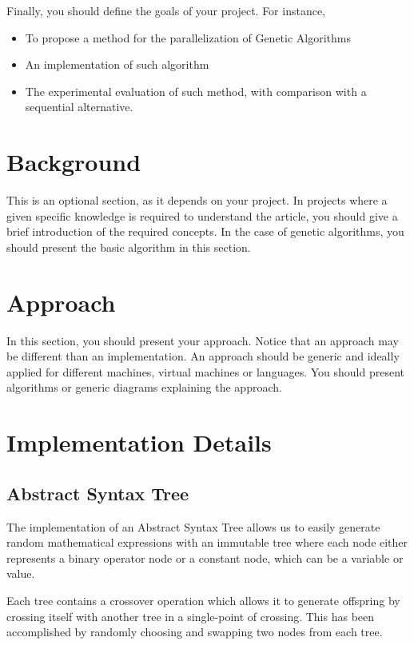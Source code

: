 \documentclass[runningheads]{llncs}
\begin{document}
Finally, you should define the goals of your project. For instance,

\begin{itemize}
	\item To propose a method for the parallelization of Genetic Algorithms
	\item An implementation of such algorithm
	\item The experimental evaluation of such method, with comparison with a sequential alternative.
\end{itemize}


\section{Background}

This is an optional section, as it depends on your project. In projects where a given specific knowledge is required to understand the article, you should give a brief introduction of the required concepts. In the case of genetic algorithms, you should present the basic algorithm in this section.


\section{Approach}

In this section, you should present your approach. Notice that an approach may be different than an implementation. An approach should be generic and ideally applied for different machines, virtual machines or languages. You should present algorithms or generic diagrams explaining the approach.

\section{Implementation Details}

\subsection{Abstract Syntax Tree}
The implementation of an Abstract Syntax Tree allows us to easily generate random mathematical expressions with an immutable tree where each node either represents a binary operator node or a constant node, which can be a variable or value.

Each tree contains a crossover operation which allows it to generate offspring by crossing itself with another tree in a single-point of crossing. This has been accomplished by randomly choosing and swapping two nodes from each tree.
\end{document}
